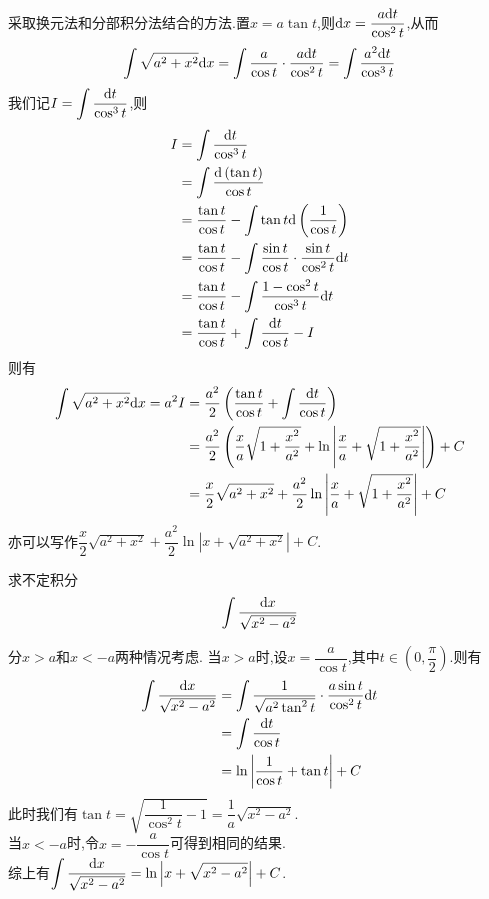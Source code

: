 \documentclass{ctexart}
\begin{document}
\begin{solution}[Solution]
    采取换元法和分部积分法结合的方法.置$x=a\tan{t}$,则$\mathrm{d} x=\dfrac{a\mathrm{d} t}{\cos^2{t}}$,从而
    $$\int{\sqrt{a^2+x^2}\mathrm{d}x}=\int \dfrac{a}{\cos{t}}\cdot\dfrac{a\mathrm{d} t}{\cos^2{t}}=\int{\dfrac{a^2\mathrm{d}t}{\cos^3{t}}}$$
    我们记$\displaystyle I=\int{\dfrac{\mathrm{d}t}{\cos^3{t}}}$,则
    $$\begin{aligned}
        I 
        &= \int{\dfrac{\mathrm{d}t}{\cos^3{t}}} \\
        &= \int{\dfrac{\mathrm{d}\left(\tan{t}\right)}{\cos{t}}} \\
        &= \dfrac{\tan{t}}{\cos{t}}-\int{\tan{t}\mathrm{d}\left(\dfrac{1}{\cos{t}}\right)} \\
        &= \dfrac{\tan{t}}{\cos{t}}-\int{\dfrac{\sin{t}}{\cos{t}}\cdot\dfrac{\sin{t}}{\cos^2{t}}\mathrm{d}t} \\
        &= \dfrac{\tan{t}}{\cos{t}}-\int{\dfrac{1-\cos^2{t}}{\cos^3{t}}\mathrm{d}t}\\
        &= \dfrac{\tan{t}}{\cos{t}}+\int{\dfrac{\mathrm{d}t}{\cos{t}}}-I
    \end{aligned}$$
    则有
    $$\begin{aligned}
        \int{\sqrt{a^2+x^2}\mathrm{d}x} = a^2I &= \dfrac{a^2}{2}\left(\dfrac{\tan{t}}{\cos{t}}+\int{\dfrac{\mathrm{d}t}{\cos{t}}}\right) \\
                                        &= \dfrac{a^2}{2}\left(\dfrac{x}{a}\sqrt{1+\dfrac{x^2}{a^2}}+\ln{\left\lvert\dfrac{x}{a}+\sqrt{1+\dfrac{x^2}{a^2}}\right\rvert}\right)+C\\
                                        &= \dfrac{x}{2}\sqrt{a^2+x^2}+\dfrac{a^2}{2}\ln{\left\lvert\dfrac{x}{a}+\sqrt{1+\dfrac{x^2}{a^2}}\right\rvert}+C
    \end{aligned}$$
    亦可以写作$\dfrac{x}{2}\sqrt{a^2+x^2}+\dfrac{a^2}{2}\ln{\left\lvert x+\sqrt{a^2+x^2}\right\rvert}+C$.\\
\end{solution}
\begin{problem}[Example 10.]
    求不定积分$$\int{\dfrac{\mathrm{d}x}{\sqrt{x^2-a^2}}}$$
\end{problem}
\begin{solution}[Solution.]
    分$x>a$和$x<-a$两种情况考虑.
    当$x>a$时,设$x=\dfrac{a}{\cos{t}}$,其中$t\in \left(0,\dfrac{\pi}{2}\right)$.则有
    $$\begin{aligned}
        \int{\dfrac{\mathrm{d}x}{\sqrt{x^2-a^2}}}
        &= \int{\dfrac{1}{\sqrt{a^2\tan^2{t}}}\cdot\dfrac{a\sin{t}}{\cos^2{t}}\mathrm{d}t} \\
        &= \int{\dfrac{\mathrm{d}t}{\cos{t}}} \\
        &= \ln{\left\lvert \dfrac{1}{\cos{t}}+\tan{t}\right\rvert}+C
    \end{aligned}$$
    此时我们有$\tan{t}=\sqrt{\dfrac{1}{\cos^2{t}}-1}=\dfrac{1}{a}\sqrt{x^2-a^2}$.\\
    当$x<-a$时,令$x=-\dfrac{a}{\cos{t}}$可得到相同的结果.\\
    综上有$\displaystyle\int{\dfrac{\mathrm{d}x}{\sqrt{x^2-a^2}}}=\ln\left\lvert x+\sqrt{x^2-a^2}\right\rvert+C$.\\
\end{solution}
\end{document}
